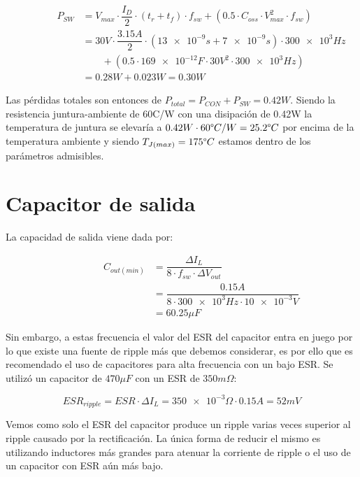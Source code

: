 \documentclass[12pt]{report}
\begin{document}
	\begin{equation}
		\begin{aligned}
		\qquad \qquad P_{SW} &= V_{max} \cdot \dfrac{I_D}{2} \cdot (t_r + t_f) \cdot f_{sw} + (0.5 \cdot C_{oss} \cdot V_{max}^2 \cdot f_{sw})\\
		& = 30V \cdot \dfrac{3.15A}{2} \cdot (\num{13e-9}s + \num{7e-9}s) \cdot \num{300e3}Hz \\
		& \qquad + (0.5 \cdot \num{169e-12}F \cdot 30V^2 \cdot \num{300e3}Hz)\\
		& = 0.28W + 0.023W = 0.30W
		\end{aligned}
	\end{equation}
	
	Las pérdidas totales son entonces de $P_{total} = P_{CON} + P_{SW} = 0.42W$. Siendo la resistencia juntura-ambiente de 60\textdegree C/W con una disipación de 0.42W la temperatura de juntura se elevaría a $0.42W \cdot 60\degree C/W = 25.2\degree C$ por encima de la temperatura ambiente y siendo $T_{J(max)} = 175\degree C$ estamos dentro de los parámetros admisibles.

\section{Capacitor de salida}

	La capacidad de salida viene dada por:

	\begin{equation}
		\begin{aligned}
		\qquad \qquad C_{out(min)} &= \dfrac{\Delta I_L}{8 \cdot f_{sw} \cdot \Delta V_{out}} \\
		& = \dfrac{0.15A}{8 \cdot \num{300e3}Hz \cdot \num{10e-3}V} \\
		& = 60.25 \mu F
		\end{aligned}
	\end{equation}

	Sin embargo, a estas frecuencia el valor del ESR del capacitor entra en juego por lo que existe una fuente de ripple más que debemos considerar, es por ello que es recomendado el uso de capacitores para alta frecuencia con un bajo ESR. Se utilizó un capacitor de $470 \mu F$ con un ESR de $350 m \Omega$:
	
	\begin{equation}
		ESR_{ripple} = ESR \cdot \Delta I_L = \num{350e-3}\Omega \cdot 0.15A = 52mV
	\end{equation}
	
	Vemos como solo el ESR del capacitor produce un ripple varias veces superior al ripple causado por la rectificación. La única forma de reducir el mismo es utilizando inductores más grandes para atenuar la corriente de ripple o el uso de un capacitor con ESR aún más bajo.
	
\end{document}
